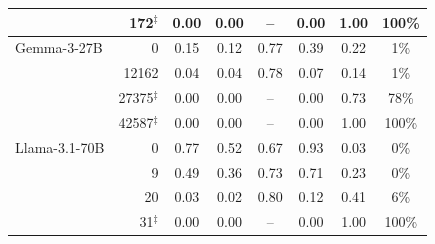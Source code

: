 \begin{table}[t]
\begin{tabular}{lr|ccc|cc|c}
               & 172$^\ddagger$ & 0.00 & 0.00 & -- & 0.00 & 1.00 & 100\% \\
\midrule
Gemma-3-27B    & 0 & 0.15 & 0.12 & 0.77 & 0.39 & 0.22 & 1\% \\
               & 12162 & 0.04 & 0.04 & 0.78 & 0.07 & 0.14 & 1\% \\
               & 27375$^\ddagger$ & 0.00 & 0.00 & -- & 0.00 & 0.73 & 78\% \\
               & 42587$^\ddagger$ & 0.00 & 0.00 & -- & 0.00 & 1.00 & 100\% \\
\midrule
Llama-3.1-70B  & 0 & 0.77 & 0.52 & 0.67 & 0.93 & 0.03 & 0\% \\
               & 9 & 0.49 & 0.36 & 0.73 & 0.71 & 0.23 & 0\% \\
               & 20 & 0.03 & 0.02 & 0.80 & 0.12 & 0.41 & 6\% \\
               & 31$^\ddagger$ & 0.00 & 0.00 & -- & 0.00 & 1.00 & 100\% \\
\bottomrule
\end{tabular}
\end{table}

